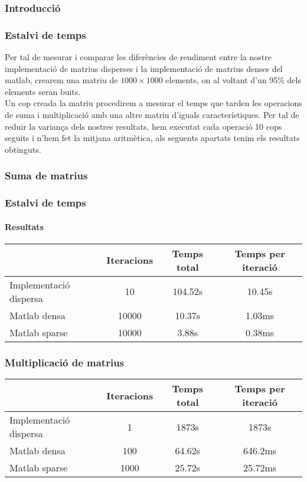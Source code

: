 \documentclass[8pt]{beamer}
\begin{document}
\subsubsection{Introducció}
\begin{frame}
  \frametitle{Estalvi de temps}
Per tal de mesurar i comparar les diferències de rendiment entre la nostre implementació de matrius disperses i la implementació de matrius denses del matlab, crearem una matriu de $1000 \times 1000$ elements,
on al voltant d'un 95\% dels elements seran buits. \\
Un cop creada la matriu procedirem a mesurar el temps que tarden les operacions de suma i multiplicació amb una altre matriu d'iguals característiques. 
Per tal de reduir la variança dels nostres resultats, hem executat cada operació 10 cops seguits i n'hem fet la mitjana aritmètica, als seguents apartats tenim els resultats obtinguts.
\end{frame}
\subsubsection{Suma de matrius}
\begin{frame}
  \frametitle{Estalvi de temps}
  \framesubtitle{Resultats}
\begin{center}
    \begin{tabular}{| l | c| c | c |}
      \hline
       & Iteracions & Temps total & Temps per iteració \\ \hline

      Implementació dispersa & 10 & 104.52s & 10.45s \\ \hline
       Matlab densa & 10000 & 10.37s & 1.03ms \\ \hline
       Matlab sparse & 10000 & 3.88s & 0.38ms \\
      \hline
    \end{tabular}
  \end{center}

\subsubsection{Multiplicació de matrius}

\begin{center}
    \begin{tabular}{| l | c| c | c |}
      \hline
       & Iteracions & Temps total & Temps per iteració \\ \hline

      Implementació dispersa & 1 & 1873s & 1873s \\ \hline
       Matlab densa & 100 & 64.62s & 646.2ms \\ \hline
       Matlab sparse & 1000 & 25.72s & 25.72ms \\
      \hline
    \end{tabular}
  \end{center}
\end{frame}
\end{document}
